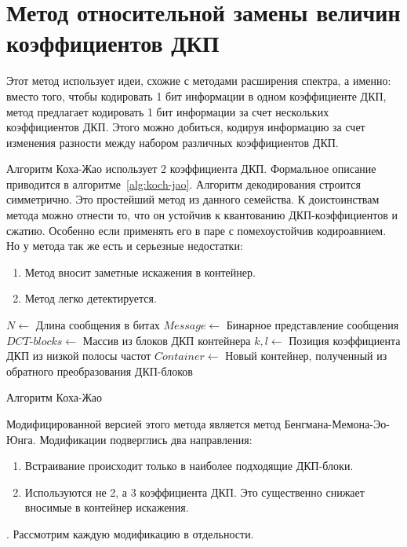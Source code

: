 \section{Метод относительной замены величин коэффициентов ДКП}
Этот метод использует идеи, схожие с методами расширения спектра, а именно:
вместо того, чтобы кодировать 1 бит информации в одном коэффициенте ДКП,
метод предлагает кодировать 1 бит информации за счет нескольких коэффициентов ДКП.
Этого можно добиться, кодируя информацию за счет изменения разности между
набором различных коэффициентов ДКП.

Алгоритм Коха-Жао использует 2 коэффициента ДКП.
Формальное описание приводится в алгоритме~\ref{alg:koch-jao}.
Алгоритм декодирования строится симметрично.
Это простейший метод из данного семейства. К доистоинствам
метода можно отнести то, что он устойчив к квантованию ДКП-коэффициентов
и сжатию. Особенно если применять его в паре с помехоустойчив кодироавнием.
Но у метода так же есть и серьезные недостатки:
\begin{enumerate}
    \item Метод вносит заметные искажения в контейнер.
    \item Метод легко детектируется.
\end{enumerate}

\begin{algorithm}[ht!]
     $N \leftarrow$ Длина сообщения в битах\;
     $Message \leftarrow$ Бинарное представление сообщения\;
     $DCT$-$blocks \leftarrow$ Массив из блоков ДКП контейнера\;
     $k, l \leftarrow$ Позиция коэффициента ДКП из низкой полосы частот\;
     $Container \leftarrow$ Новый контейнер, полученный из обратного преобразования ДКП-блоков\;
     \caption{Алгоритм Коха-Жао}
    \label{alg:koch-jao}
\end{algorithm}

Модифицированной версией этого метода является метод Бенгмана-Мемона-Эо-Юнга.
Модификации подверглись два направления:
\begin{enumerate}
    \item Встраивание происходит только в наиболее подходящие ДКП-блоки.
    \item Используются не 2, а 3 коэффициента ДКП. Это существенно снижает
    вносимые в контейнер искажения.
\end{enumerate}.
Рассмотрим каждую модификацию в отдельности.

